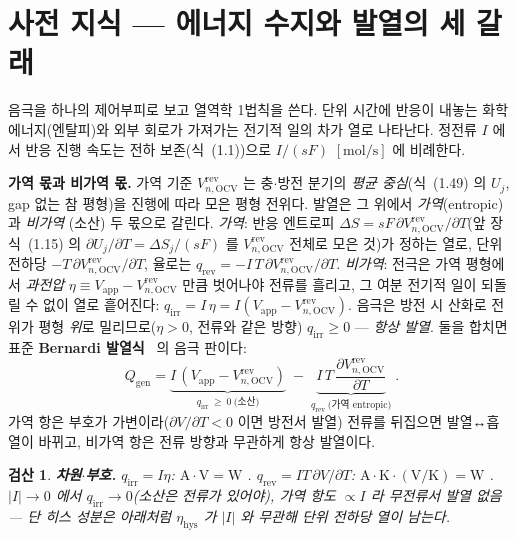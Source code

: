 \documentclass[11pt,a4paper]{article}
\newtheorem*{verifybox}{검산}
\newcommand{\app}{\mathrm{app}}
\newcommand{\OCV}{\mathrm{OCV}}
\newcommand{\hys}{\mathrm{hys}}
\newcommand{\rev}{\mathrm{rev}}
\newcommand{\irr}{\mathrm{irr}}
\newcommand{\gen}{\mathrm{gen}}
\begin{document}
\section{사전 지식 — 에너지 수지와 발열의 세 갈래}\label{sec:h_bg}
음극을 하나의 제어부피로 보고 열역학 1법칙을 쓴다. 단위 시간에 반응이 내놓는 화학에너지(엔탈피)와 외부 회로가
가져가는 전기적 일의 차가 열로 나타난다. 정전류 $I$ 에서 반응 진행 속도는 전하 보존(식~(1.1))으로 $I/(sF)$
$[\mathrm{mol/s}]$ 에 비례한다.

\textbf{가역 몫과 비가역 몫.} 가역 기준 $V_{n,\OCV}^\rev$ 는 충$\cdot$방전 분기의 \emph{평균 중심}(식~(1.49) 의
$U_j$, gap 없는 참 평형)을 진행에 따라 모은 평형 전위다. 발열은 그 위에서 \emph{가역}(entropic)과 \emph{비가역}
(소산) 두 몫으로 갈린다.
\emph{가역}: 반응 엔트로피 $\Delta S=sF\,\partial V_{n,\OCV}^\rev/\partial T$(앞 장 식~(1.15) 의 $\partial
U_j/\partial T=\Delta S_j/(sF)$ 를 $V_{n,\OCV}^\rev$ 전체로 모은 것)가 정하는 열로, 단위 전하당 $-T\,\partial
V_{n,\OCV}^\rev/\partial T$, 율로는 $q_\rev=-I\,T\,\partial V_{n,\OCV}^\rev/\partial T$.
\emph{비가역}: 전극은 가역 평형에서 \emph{과전압} $\eta\equiv V_\app-V_{n,\OCV}^\rev$ 만큼 벗어나야 전류를 흘리고,
그 여분 전기적 일이 되돌릴 수 없이 열로 흩어진다: $q_\irr=I\,\eta=I(V_\app-V_{n,\OCV}^\rev)$. 음극은 방전 시
산화로 전위가 평형 \emph{위}로 밀리므로($\eta>0$, 전류와 같은 방향) $q_\irr\ge0$ — \emph{항상 발열}. 둘을 합치면
표준 \textbf{Bernardi 발열식}~\cite{bernardi1985} 의 음극 판이다:
\begin{equation}
\boxed{\;Q_\gen=\underbrace{I\,(V_\app-V_{n,\OCV}^\rev)}_{q_\irr\ \ge\ 0\ \text{(소산)}}
\;-\;\underbrace{I\,T\,\frac{\partial V_{n,\OCV}^\rev}{\partial T}}_{q_\rev\ \text{(가역 entropic)}}\;.}
\label{eq:h_bernardi}
\end{equation}
가역 항은 부호가 가변이라($\partial V/\partial T<0$ 이면 방전서 발열) 전류를 뒤집으면 발열↔흡열이 바뀌고,
비가역 항은 전류 방향과 무관하게 항상 발열이다.
\begin{verifybox}
\textbf{차원$\cdot$부호.} $q_\irr=I\eta$: $\mathrm{A\cdot V=W}$ \checkmark. $q_\rev=IT\,\partial V/\partial T$:
$\mathrm{A\cdot K\cdot(V/K)=W}$ \checkmark. $|I|\to0$ 에서 $q_\irr\to0$(소산은 전류가 있어야), 가역 항도
$\propto I$ 라 무전류서 발열 없음 — 단 \emph{히스 성분}은 아래처럼 $\eta_\hys$ 가 $|I|$ 와 무관해 단위 전하당 열이
남는다.
\end{verifybox}
\end{document}
